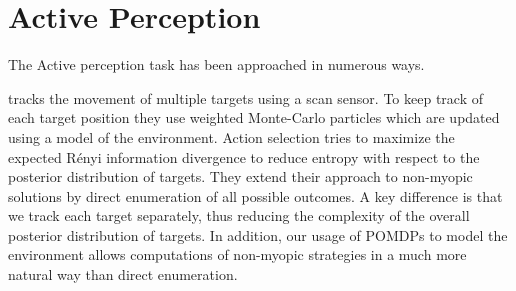 \section{Active Perception}

The Active perception task has been approached in numerous ways.

%

%

%

\cite{cit:relworktanks} tracks the movement of multiple targets using a scan sensor. To keep track
of each target position they use weighted Monte-Carlo particles which are updated using a model of
the environment. Action selection tries to maximize the expected Rényi information divergence to
reduce entropy with respect to the posterior distribution of targets. They extend their approach to
non-myopic solutions by direct enumeration of all possible outcomes. A key difference is that we
track each target separately, thus reducing the complexity of the overall posterior distribution of
targets. In addition, our usage of POMDPs to model the environment allows computations of non-myopic
strategies in a much more natural way than direct enumeration. 

